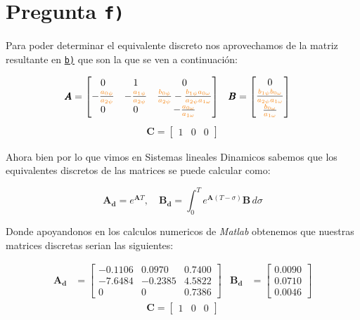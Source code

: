 \section{Pregunta \texttt{f)}}\label{pregunta-f}

Para poder determinar el equivalente discreto nos aprovechamos de la matriz resultante en \hyperref[pregunta-b]{\texttt{b)}} que son la que se ven a continuación:

\begin{align}
    \pmb{A} &= \begin{bmatrix}
        0 & 1 & 0 \\
        -\frac{\nara{a_{0\psi}}}{\nara{a_{2\psi}}}   & -\frac{\nara{a_{1\psi}}}{\nara{a_{2\psi}}} & \frac{\nara{b_{0\psi}}}{\nara{a_{2\psi}}} - \frac{\nara{b_{1\psi}}\nara{a_{0\omega}}}{\nara{a_{2\psi}}\nara{a_{1\omega}}} \\
        0 & 0 & -\frac{\nara{a_{0\omega}}}{\nara{a_{1\omega}}}
    \end{bmatrix} &
    \pmb{B} &= \begin{bmatrix}
        0 \\
        \frac{\nara{b_{1\psi}}\nara{b_{0\omega}}}{\nara{a_{2\psi}}\nara{a_{1\omega}}} \\
        \frac{\nara{b_{0\omega}}}{\nara{a_{1\omega}}}
    \end{bmatrix}
  \end{align}
  \begin{align}
    \pmb{C} = \begin{bmatrix}
      1 & 0 & 0
    \end{bmatrix}
  \end{align}

Ahora bien por lo que vimos en Sistemas lineales Dinamicos sabemos que los equivalentes discretos de las matrices se puede calcular como:

\[
\mathbf{A_d}= e^{\mathbf{A}T} ,\quad \mathbf{B_d}= \int_{0}^{T} e^{\mathbf{A}(T-\sigma)}\mathbf{B}  \,d\sigma 
\]

Donde apoyandonos en los calculos numericos de \textit{Matlab} obtenemos que nuestras matrices discretas serian las siguientes:


\begin{align}
    \mathbf{A_d} &= \begin{bmatrix}
        -0.1106 & 0.0970 & 0.7400 \\
        -7.6484 &  -0.2385 & 4.5822 \\
        0 & 0 & 0.7386
    \end{bmatrix} &
    \mathbf{B_d} &= \begin{bmatrix}
        0.0090 \\
        0.0710 \\
        0.0046
    \end{bmatrix}
  \end{align}
  \begin{align}
    \pmb{C} = \begin{bmatrix}
      1 & 0 & 0
    \end{bmatrix}
\end{align}

